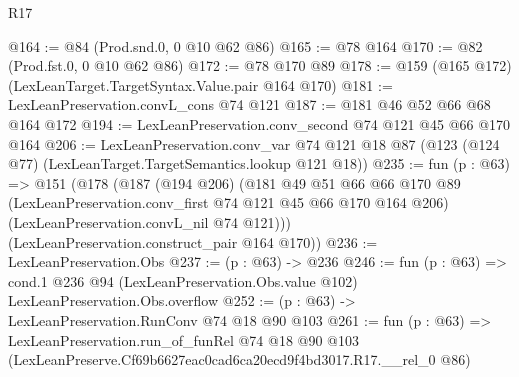 \begin{lexlean}{R17}
\begin{coremodule}
@164 := @84 (Prod.snd.{0, 0} @10 @62 @86)
@165 := @78 @164
@170 := @82 (Prod.fst.{0, 0} @10 @62 @86)
@172 := @78 @170 @89
@178 := @159 (@165 @172) (LexLeanTarget.TargetSyntax.Value.pair @164 @170)
@181 := LexLeanPreservation.convL_cons @74 @121
@187 := @181 @46 @52 @66 @68 @164 @172
@194 := LexLeanPreservation.conv_second @74 @121 @45 @66 @170 @164
@206 := LexLeanPreservation.conv_var
    @74
    @121
    @18
    @87
    (@123 (@124 @77) (LexLeanTarget.TargetSemantics.lookup @121 @18))
@235 := fun (p : @63) =>
  @151
    (@178
      (@187
        (@194 @206)
        (@181
          @49
          @51
          @66
          @66
          @170
          @89
          (LexLeanPreservation.conv_first @74 @121 @45 @66 @170 @164 @206)
          (LexLeanPreservation.convL_nil @74 @121)))
      (LexLeanPreservation.construct_pair @164 @170))
@236 := LexLeanPreservation.Obs
@237 := (p : @63) -> @236
@246 := fun (p : @63) =>
  cond.{1} @236 @94 (LexLeanPreservation.Obs.value @102) LexLeanPreservation.Obs.overflow
@252 := (p : @63) -> LexLeanPreservation.RunConv @74 @18 @90 @103
@261 := fun (p : @63) =>
  LexLeanPreservation.run_of_funRel
    @74
    @18
    @90
    @103
    (LexLeanPreserve.Cf69b6627eac0cad6ca20ecd9f4bd3017.R17.__rel_0 @86)
\end{coremodule}
\end{lexlean}
